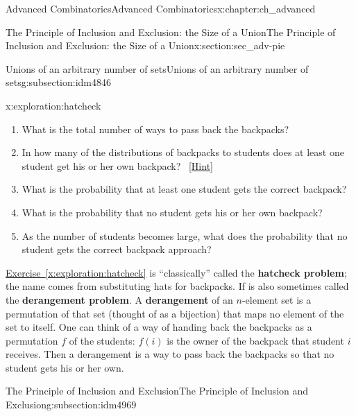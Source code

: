 \documentclass[oneside,10pt,]{book}
\newcommand{\terminology}[1]{\textbf{#1}}
\numberwithin{equation}{chapter}
\begin{document}
\begin{chapterptx}{Advanced Combinatorics}{}{Advanced Combinatorics}{}{}{x:chapter:ch_advanced}
\begin{sectionptx}{The Principle of Inclusion and Exclusion: the Size of a Union}{}{The Principle of Inclusion and Exclusion: the Size of a Union}{}{}{x:section:sec_adv-pie}
\begin{subsectionptx}{Unions of an arbitrary number of sets}{}{Unions of an arbitrary number of sets}{}{}{g:subsection:idm4846}
\begin{exploration}{}{x:exploration:hatcheck}
\begin{enumerate}[font=\bfseries,label=(\alph*),ref=\alph*]
\item{}What is the total number of ways to pass back the backpacks?%
\item{}In how many of the distributions of backpacks to students does at least one student get his or her own backpack?%
\qquad~\hfill{\tiny\hyperlink{g:hint:idm4899-back}{[Hint]}}\item{}What is the probability that at least one student gets the correct backpack?%
\item\label{x:task:hatcheckprobpart}What is the probability that no student gets his or her own backpack?%
\item{}As the number of students becomes large, what does the probability that no student gets the correct backpack approach?%
\end{enumerate}
\end{exploration}
\hyperref[x:exploration:hatcheck]{Exercise~\ref{x:exploration:hatcheck}} is ``classically'' called the \terminology{hatcheck problem}; the name comes from substituting hats for backpacks. If is also sometimes called the \terminology{derangement problem}. A \terminology{derangement} of an \(n\)-element set is a permutation of that set (thought of as a bijection) that maps no element of the set to itself. One can think of a way of handing back the backpacks as a permutation \(f\) of the students: \(f(i)\) is the owner of the backpack that student \(i\) receives. Then a derangement is a way to pass back the backpacks so that no student gets his or her own.%
\end{subsectionptx}
%
%
\typeout{************************************************}
\typeout{************************************************}
%
\begin{subsectionptx}{The Principle of Inclusion and Exclusion}{}{The Principle of Inclusion and Exclusion}{}{}{g:subsection:idm4969}

\end{subsectionptx}
\end{sectionptx}
\end{chapterptx}
\end{document}
